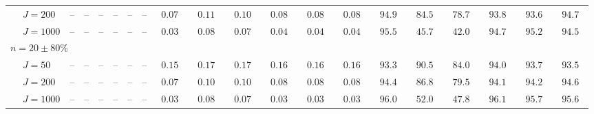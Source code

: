 \begin{sidewaystable}
\begin{threeparttable}
\begin{tabular}{llcccccccccccccccccc}
 & \nopagebreak $\;J=200$  & \phantom{00}--\phantom{00} & \phantom{00}--\phantom{00} & \phantom{00}--\phantom{00} & \phantom{00}--\phantom{00} & \phantom{00}--\phantom{00} & \phantom{00}--\phantom{00} & $\phantom{0}0.07\phantom{0}$ & $\phantom{0}0.11\phantom{0}$ & $\phantom{0}0.10\phantom{0}$ & $\phantom{0}0.08\phantom{0}$ & $\phantom{0}0.08\phantom{0}$ & $\phantom{0}0.08\phantom{0}$ & $\phantom{0}94.9\phantom{0}$ & $\phantom{0}84.5\phantom{0}$ & $\phantom{0}78.7\phantom{0}$ & $\phantom{0}93.8\phantom{0}$ & $\phantom{0}93.6\phantom{0}$ & $\phantom{0}94.7\phantom{0}$ \\
 & \nopagebreak $\;J=1000$  & \phantom{00}--\phantom{00} & \phantom{00}--\phantom{00} & \phantom{00}--\phantom{00} & \phantom{00}--\phantom{00} & \phantom{00}--\phantom{00} & \phantom{00}--\phantom{00} & $\phantom{0}0.03\phantom{0}$ & $\phantom{0}0.08\phantom{0}$ & $\phantom{0}0.07\phantom{0}$ & $\phantom{0}0.04\phantom{0}$ & $\phantom{0}0.04\phantom{0}$ & $\phantom{0}0.04\phantom{0}$ & $\phantom{0}95.5\phantom{0}$ & $\phantom{0}45.7\phantom{0}$ & $\phantom{0}42.0\phantom{0}$ & $\phantom{0}94.7\phantom{0}$ & $\phantom{0}95.2\phantom{0}$ & $\phantom{0}94.5\phantom{0}$ \\
\multicolumn{4}{l}{$n=20\pm80\%$ } \\  & \nopagebreak $\;J=50$  & \phantom{00}--\phantom{00} & \phantom{00}--\phantom{00} & \phantom{00}--\phantom{00} & \phantom{00}--\phantom{00} & \phantom{00}--\phantom{00} & \phantom{00}--\phantom{00} & $\phantom{0}0.15\phantom{0}$ & $\phantom{0}0.17\phantom{0}$ & $\phantom{0}0.17\phantom{0}$ & $\phantom{0}0.16\phantom{0}$ & $\phantom{0}0.16\phantom{0}$ & $\phantom{0}0.16\phantom{0}$ & $\phantom{0}93.3\phantom{0}$ & $\phantom{0}90.5\phantom{0}$ & $\phantom{0}84.0\phantom{0}$ & $\phantom{0}94.0\phantom{0}$ & $\phantom{0}93.7\phantom{0}$ & $\phantom{0}93.5\phantom{0}$ \\
 & \nopagebreak $\;J=200$  & \phantom{00}--\phantom{00} & \phantom{00}--\phantom{00} & \phantom{00}--\phantom{00} & \phantom{00}--\phantom{00} & \phantom{00}--\phantom{00} & \phantom{00}--\phantom{00} & $\phantom{0}0.07\phantom{0}$ & $\phantom{0}0.10\phantom{0}$ & $\phantom{0}0.10\phantom{0}$ & $\phantom{0}0.08\phantom{0}$ & $\phantom{0}0.08\phantom{0}$ & $\phantom{0}0.08\phantom{0}$ & $\phantom{0}94.4\phantom{0}$ & $\phantom{0}86.8\phantom{0}$ & $\phantom{0}79.5\phantom{0}$ & $\phantom{0}94.1\phantom{0}$ & $\phantom{0}94.2\phantom{0}$ & $\phantom{0}94.6\phantom{0}$ \\
 & \nopagebreak $\;J=1000$  & \phantom{00}--\phantom{00} & \phantom{00}--\phantom{00} & \phantom{00}--\phantom{00} & \phantom{00}--\phantom{00} & \phantom{00}--\phantom{00} & \phantom{00}--\phantom{00} & $\phantom{0}0.03\phantom{0}$ & $\phantom{0}0.08\phantom{0}$ & $\phantom{0}0.07\phantom{0}$ & $\phantom{0}0.03\phantom{0}$ & $\phantom{0}0.03\phantom{0}$ & $\phantom{0}0.03\phantom{0}$ & $\phantom{0}96.0\phantom{0}$ & $\phantom{0}52.0\phantom{0}$ & $\phantom{0}47.8\phantom{0}$ & $\phantom{0}96.1\phantom{0}$ & $\phantom{0}95.7\phantom{0}$ & $\phantom{0}95.6\phantom{0}$ \\

\end{tabular}
\end{threeparttable}
\end{sidewaystable}
